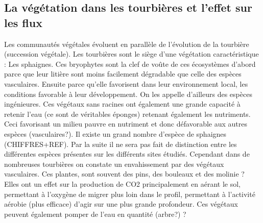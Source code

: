 \subsection{La végétation dans les tourbières et l'effet sur les flux}
Les communautés végétales évoluent en parallèle de l'évolution de la tourbière (succession végétale).
Les tourbières sont le siège d'une végétation caractéristique : Les sphaignes.
Ces bryophytes sont la clef de voûte de ces écosystèmes d'abord parce que leur litière sont moins facilement dégradable que celle des espèces vasculaires.
Ensuite parce qu'elle favorisent dans leur environnement local, les conditions favorable à leur développement. 
On les appelle d'ailleurs des espèces ingénieures.
Ces végétaux sans racines ont également une grande capacité à retenir l'eau (ce sont de véritables éponges) retenant également les nutriments. 
Ceci favorisant un milieu pauvre en nutriment et donc défavorable aux autres espèces (vasculaires?).
Il existe un grand nombre d'espèce de sphaignes (CHIFFRES+REF).
Par la suite il ne sera pas fait de distinction entre les différentes espèces présentes sur les différents sites étudiés.
Cependant dans de nombreuses tourbières on constate un envahissement par des végétaux vasculaires.
Ces plantes, sont souvent des pins, des bouleaux et des molinie ?
Elles ont un effet sur la production de CO2 principalement en aérant le sol, permettant à l'oxygène de migrer plus loin dans le profil, permettant à l'activité aérobie (plus efficace) d'agir sur une plus grande profondeur.
Ces végétaux peuvent également pomper de l'eau en quantité (arbre?) ?





